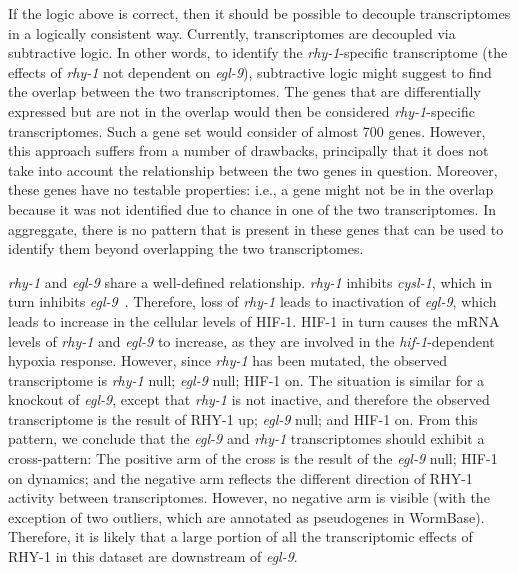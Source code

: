 \documentclass[9pt,twocolumn,twoside]{pnas-new}
\newcommand{\egl}{\emph{egl-9}}
\newcommand{\cysl}{\emph{cysl-1}}
\newcommand{\rhy}{\emph{rhy-1}}
\newcommand{\hif}{\emph{hif-1}}
\newcommand{\rhyp}{RHY-1}
\newcommand{\hifp}{HIF-1}
\begin{document}
If the logic above is correct, then it should be possible to decouple
transcriptomes in a logically consistent way. Currently, transcriptomes are
decoupled via subtractive logic. In other words, to identify the \rhy{}-specific
transcriptome (the effects of \rhy{} not dependent on \egl{}), subtractive logic
might suggest to find the overlap between the two transcriptomes. The genes that
are differentially expressed but are not in the overlap would then be considered
\rhy{}-specific transcriptomes. Such a gene set would consider of almost
700 genes. However, this approach suffers from a number of
drawbacks, principally that it does not take into account the relationship
between the two genes in question. Moreover, these genes have no testable properties:
i.e., a gene might not be in the overlap because it was not identified due to
chance in one of the two transcriptomes. In aggreggate, there is no pattern that
is present in these genes that can be used to identify them beyond overlapping
the two transcriptomes.

\rhy{} and \egl{} share a well-defined relationship. \rhy{} inhibits \cysl{},
which in turn inhibits \egl{}~\cite{Ma2012}. Therefore, loss of \rhy{} leads
to inactivation of \egl{}, which leads to increase in the cellular levels of
\hifp{}. \hifp{} in turn causes the mRNA levels of \rhy{} and \egl{} to increase,
as they are involved in the \hif{}-dependent hypoxia response. However, since
\rhy{} has been mutated, the observed transcriptome is \rhy{} null; \egl{} null;
\hifp{} on. The situation is similar for a knockout of \egl{}, except that \rhy{}
is not inactive, and therefore the observed transcriptome is the result of
\rhyp{} up; \egl{} null; and \hifp{} on. From this pattern, we conclude that
the \egl{} and \rhy{} transcriptomes should exhibit a cross-pattern: The positive
arm of the cross is the result of the \egl{} null; \hifp{} on dynamics; and the
negative arm reflects the different direction of \rhyp{} activity between
transcriptomes. However, no negative arm is visible (with the exception of two
outliers, which are annotated as pseudogenes in WormBase). Therefore, it is likely
that a large portion of all the transcriptomic effects of \rhyp{} in this dataset
are downstream of \egl{}.
\end{document}
